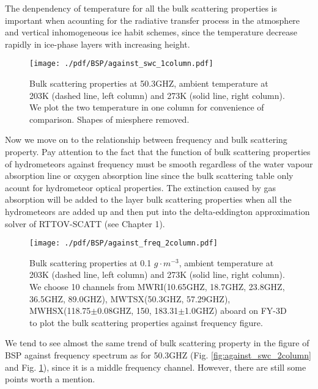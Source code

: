 The denpendency of temperature for all the bulk scattering properties is important when acounting for the radiative transfer process in the
atmosphere and vertical inhomogeneous ice habit schemes, since the temperature decrease rapidly in ice-phase layers with increasing height.

\begin{figure}[hbtp] 
\centering
\texttt{[image: ./pdf/BSP/against\_swc\_1column.pdf]}
\caption{Bulk scattering properties at 50.3GHZ, ambient temperature at 203K (dashed line, left column) and 273K (solid line, right column).
We plot the two temperature in one column for convenience of comparison. Shapes of miesphere removed.}
\label{fig:against_swc_1column}
\end{figure}


Now we move on to the relationship between frequency and bulk scattering property. Pay attention to the fact that the function of bulk scattering properties 
of hydrometeors against frequency must be smooth regardless of the water vapour absorption line or oxygen absorption line
since the bulk scattering table only acount for hydrometeor optical properties. The extinction caused by gas absorption will be added to the layer bulk scattering properties
when all the hydrometeors are added up and then put into the delta-eddington approximation solver of RTTOV-SCATT (see Chapter 1).   

\begin{figure}[hbtp] 
\centering
\texttt{[image: ./pdf/BSP/against\_freq\_2column.pdf]}
\caption{Bulk scattering properties at 0.1 $g \cdot m^{-3}$, ambient temperature at 203K (dashed line, left column) and 273K (solid line, right column).
We choose 10 channels from MWRI(10.65GHZ, 18.7GHZ, 23.8GHZ, 36.5GHZ, 89.0GHZ), MWTSX(50.3GHZ, 57.29GHZ), MWHSX(118.75$\pm$0.08GHZ, 150, 183.31$\pm$1.0GHZ) aboard on FY-3D
to plot the bulk scattering properties against frequency figure.}
\label{fig:against_freq_2column}
\end{figure}

We tend to see almost the same trend of bulk scattering property in the figure of BSP against frequency spectrum as for 50.3GHZ (Fig. \ref{fig:against_swc_2column} and 
Fig. \ref{fig:against_swc_1column}), since it is a middle frequency channel.
However, there are still some points worth a mention. 

